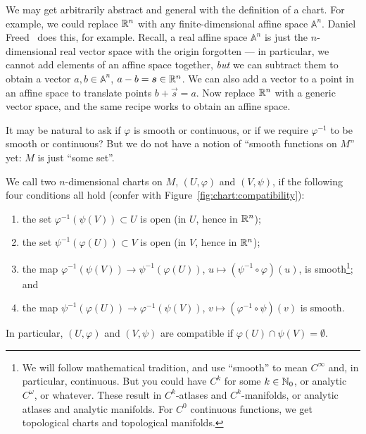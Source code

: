 \begin{remark}
We may get arbitrarily abstract and general with the definition of a
chart. For example, we could replace $\mathbb{R}^{n}$ with any
finite-dimensional affine space
$\mathbb{A}^{n}$. Daniel Freed~\cite{freed2022:notes} does this, for example.
Recall, a real affine space $\mathbb{A}^{n}$ is just the $n$-dimensional
real vector space with the origin forgotten --- in particular, we cannot
add elements of an affine space together, \emph{but} we can subtract
them to obtain a vector $a,b\in\mathbb{A}^{n}$, $a-b=\boldsymbol{s}\in\mathbb{R}^{n}$.
We can also add a vector to a point in an affine space to translate
points $b+\vec{s}=a$. Now replace $\mathbb{R}^{n}$ with a generic vector space,
and the same recipe works to obtain an affine space.
\end{remark}

\begin{remark}
It may be natural to ask if $\varphi$ is smooth or continuous, or if
we require $\varphi^{-1}$ to be smooth or continuous? But we do not have
a notion of ``smooth functions on $M$'' yet: $M$ is just ``some set''.
\end{remark}

\begin{definition}\label{defn:chart:compatible}
We call two $n$-dimensional charts on $M$, $(U,\varphi)$ and $(V,\psi)$,
 if the following four conditions all hold (confer
with Figure~\ref{fig:chart:compatibility}):
\begin{enumerate}
\item the set $\varphi^{-1}\left(\psi(V)\right)\subset U$ is open (in
  $U$, hence in $\mathbb{R}^{n}$);
\item the set $\psi^{-1}\left(\varphi(U)\right)\subset V$ is open (in $V$,
  hence in $\mathbb{R}^{n}$);
\item\label{property:chart-compatible:transition-fun1} the map $\varphi^{-1}\left(\psi(V)\right)\to\psi^{-1}\left(\varphi(U)\right)$,
$u\mapsto(\psi^{-1}\circ\varphi)(u)$, is smooth\footnote{We will follow
mathematical tradition, and use ``smooth'' to mean $C^{\infty}$ and, in
particular, continuous. But you could have $C^{k}$ for some
$k\in\mathbb{N}_{0}$, or analytic $C^{\omega}$, or whatever. These result in
$C^{k}$-atlases and $C^{k}$-manifolds, or analytic atlases and analytic
manifolds. For $C^{0}$ continuous functions, we get topological charts
and topological manifolds.}; and
\item\label{property:chart-compatible:transition-fun2} the map $\psi^{-1}\left(\varphi(U)\right)\to\varphi^{-1}\left(\psi(V)\right)$,
$v\mapsto(\varphi^{-1}\circ\psi)(v)$ is smooth.
\end{enumerate}
In particular, $(U,\varphi)$ and $(V,\psi)$ are compatible if $\varphi(U)\cap\psi(V)=\emptyset$.
\end{definition}

